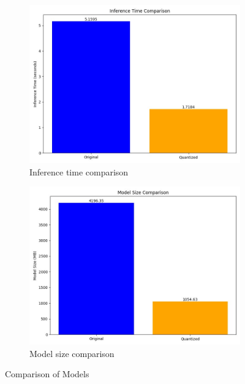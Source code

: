 \documentclass{josis}
\begin{document}
\begin{figure}[H]
\centering
\begin{subfigure}[b]{0.45\textwidth}
    \centering
    \includegraphics[width=\textwidth]{inf.jpg}
    \caption{Inference time comparison}
    \label{fig:inference}
\end{subfigure}
\begin{subfigure}[b]{0.45\textwidth}
    \centering
    \includegraphics[width=\textwidth]{ms.jpg}
    \caption{Model size comparison}
    \label{fig:inference}
\end{subfigure}
\caption{Comparison of Models}
\label{fig:model-comparison}
\end{figure}
\end{document}
